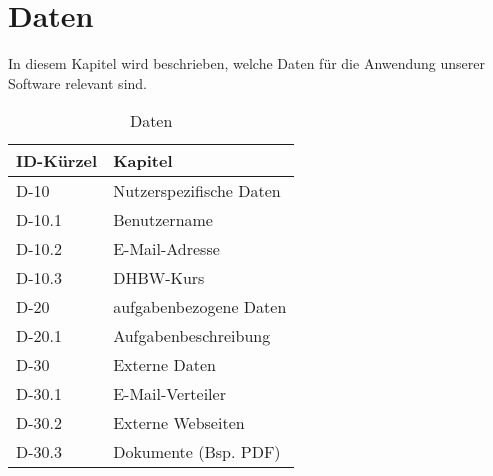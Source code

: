 
\chapter{Daten}

In diesem Kapitel wird beschrieben, welche Daten für die Anwendung unserer Software relevant sind.\\

\begin{table}[H]
    \caption{Daten}
    \label{einleitung:kapitel}
    \begin{tabularx}{\textwidth}{|l|X|}
        \toprule
        \textbf{ID-Kürzel} & \textbf{Kapitel} \\
        \endhead
        \hline
        D-10 & Nutzerspezifische Daten \\
        D-10.1 & Benutzername \\
        D-10.2 & E-Mail-Adresse \\
        D-10.3 & DHBW-Kurs\\
        D-20 & aufgabenbezogene Daten \\
        D-20.1 & Aufgabenbeschreibung \\        
        D-30 & Externe Daten \\
        D-30.1 & E-Mail-Verteiler \\
        D-30.2 & Externe Webseiten \\
        D-30.3 & Dokumente (Bsp. PDF)\\
        \hline
    \end{tabularx}
\end{table}


